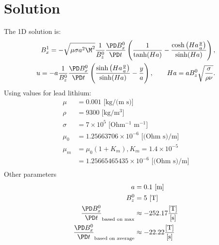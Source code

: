 \documentclass[11pt]{article}
\begin{document}
\doublespacing
\MOONSTITLE
\maketitle

\section{Solution}
The 1D solution is:
\begin{equation}\begin{aligned}
B_x^1 = - \sqrt{\mu \sigma a^2 \M^2} \frac{1}{B_z^0} \frac{\PD B_x^0}{\PD t} \left( \frac{1}{\tanh(Ha)} -  \frac{\cosh \left(Ha \frac{y}{a} \right)}{\sinh(Ha)}\right), \\
u   = -a \frac{1}{B_z^0} \frac{\PD B_x^0}{\PD t} \left( \frac{\sinh\left(Ha \frac{y}{a} \right)}{\sinh(Ha)} - \frac{y}{a} \right), \qquad
Ha = a B_z^0 \sqrt{\frac{\sigma}{\rho \nu}}. \\
\end{aligned} \end{equation}
Using values for lead lithium:
\begin{equation}\begin{aligned}
\mu    & = 0.001 \text{ [kg/(m s)]} \\
\rho   & = 9300 \text{ [kg/m$^3$]} \\
\sigma & = 7 \times 10^5 \text{ [Ohm$^{-1}$ m$^{-1}$]} \\
\mu_0  & = 1.25663706    \times 10^{-6} \text{ [(Ohm s)/m]} \\
\mu_m  & = \mu_0 (1+K_m), K_m = 1.4 \times 10^{-5} \\
       & = 1.25665465435 \times 10^{-6} \text{ [(Ohm s)/m]} \\
\end{aligned} \end{equation}
Other parameters
\begin{equation}\begin{aligned}
a                       & = 0.1 \text{ [m]}\\
B_z^0                   & = 5 \text{ [T]}\\
\frac{\PD B_x^0}{\PD t}_{\text{based on max}} & \approx -252.17 \frac{\text{[T]}}{\text{[s]}} \\
\frac{\PD B_x^0}{\PD t}_{\text{based on average}} & \approx -22.22 \frac{\text{[T]}}{\text{[s]}} \\
\end{aligned} \end{equation}
\end{document}
